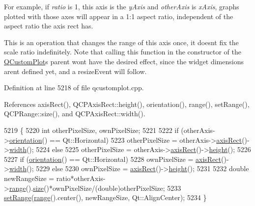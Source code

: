 For example, if {\itshape ratio} is 1, this axis is the {\itshape y\+Axis} and {\itshape other\+Axis} is {\itshape x\+Axis}, graphs plotted with those axes will appear in a 1\+:1 aspect ratio, independent of the aspect ratio the axis rect has.

This is an operation that changes the range of this axis once, it doesn\textquotesingle{}t fix the scale ratio indefinitely. Note that calling this function in the constructor of the \hyperlink{class_q_custom_plot}{Q\+Custom\+Plot}\textquotesingle{}s parent won\textquotesingle{}t have the desired effect, since the widget dimensions aren\textquotesingle{}t defined yet, and a resize\+Event will follow. 

Definition at line 5218 of file qcustomplot.\+cpp.



References axis\+Rect(), Q\+C\+P\+Axis\+Rect\+::height(), orientation(), range(), set\+Range(), Q\+C\+P\+Range\+::size(), and Q\+C\+P\+Axis\+Rect\+::width().


\begin{DoxyCode}
5219 \{
5220   \textcolor{keywordtype}{int} otherPixelSize, ownPixelSize;
5221   
5222   \textcolor{keywordflow}{if} (otherAxis->\hyperlink{class_q_c_p_axis_a57483f2f60145ddc9e63f3af53959265}{orientation}() == Qt::Horizontal)
5223     otherPixelSize = otherAxis->\hyperlink{class_q_c_p_axis_aada3102af43b029e3879bcbf2bddfabb}{axisRect}()->\hyperlink{class_q_c_p_axis_rect_a45bf5c17f4ca29131b7eb0db06efc259}{width}();
5224   \textcolor{keywordflow}{else}
5225     otherPixelSize = otherAxis->\hyperlink{class_q_c_p_axis_aada3102af43b029e3879bcbf2bddfabb}{axisRect}()->\hyperlink{class_q_c_p_axis_rect_a1c55c4f3bef40cf01b21820316c8469e}{height}();
5226   
5227   \textcolor{keywordflow}{if} (\hyperlink{class_q_c_p_axis_a57483f2f60145ddc9e63f3af53959265}{orientation}() == Qt::Horizontal)
5228     ownPixelSize = \hyperlink{class_q_c_p_axis_aada3102af43b029e3879bcbf2bddfabb}{axisRect}()->\hyperlink{class_q_c_p_axis_rect_a45bf5c17f4ca29131b7eb0db06efc259}{width}();
5229   \textcolor{keywordflow}{else}
5230     ownPixelSize = \hyperlink{class_q_c_p_axis_aada3102af43b029e3879bcbf2bddfabb}{axisRect}()->\hyperlink{class_q_c_p_axis_rect_a1c55c4f3bef40cf01b21820316c8469e}{height}();
5231   
5232   \textcolor{keywordtype}{double} newRangeSize = ratio*otherAxis->\hyperlink{class_q_c_p_axis_ab1ea79a4f5ea4cf42620f8f51c477ac4}{range}().\hyperlink{class_q_c_p_range_afa57c13049b965edb6fd1c00ac56338a}{size}()*ownPixelSize/(double)otherPixelSize;
5233   \hyperlink{class_q_c_p_axis_aebdfea5d44c3a0ad2b4700cd4d25b641}{setRange}(\hyperlink{class_q_c_p_axis_ab1ea79a4f5ea4cf42620f8f51c477ac4}{range}().center(), newRangeSize, Qt::AlignCenter);
5234 \}
\end{DoxyCode}


